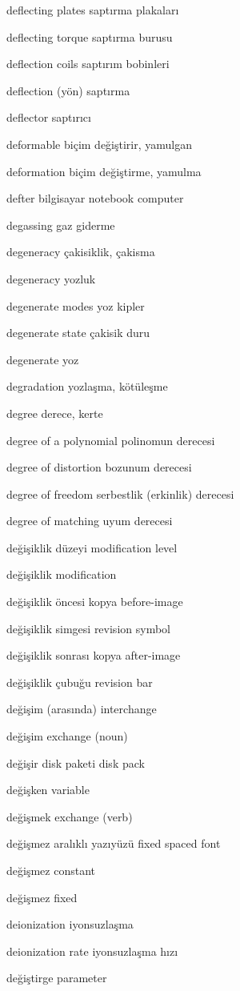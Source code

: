 \documentclass[12pt,fleqn]{article}\usepackage{../../common}
\begin{document}
deflecting plates saptırma plakaları

deflecting torque saptırma burusu

deflection coils saptırım bobinleri

deflection (yön) saptırma

deflector saptırıcı

deformable biçim değiştirir, yamulgan

deformation biçim değiştirme, yamulma

defter bilgisayar notebook computer

degassing gaz giderme

degeneracy çakisiklik, çakisma

degeneracy yozluk

degenerate modes yoz kipler

degenerate state çakisik duru

degenerate yoz

degradation yozlaşma, kötüleşme

degree derece, kerte

degree of a polynomial polinomun derecesi

degree of distortion bozunum derecesi

degree of freedom serbestlik (erkinlik) derecesi

degree of matching uyum derecesi

değişiklik düzeyi modification level

değişiklik modification

değişiklik öncesi kopya before-image

değişiklik simgesi revision symbol

değişiklik sonrası kopya after-image

değişiklik çubuğu revision bar

değişim (arasında) interchange

değişim exchange (noun)

değişir disk paketi disk pack

değişken variable

değişmek exchange (verb)

değişmez aralıklı yazıyüzü fixed spaced font

değişmez constant

değişmez fixed

deionization iyonsuzlaşma

deionization rate iyonsuzlaşma hızı

değiştirge parameter
\end{document}
